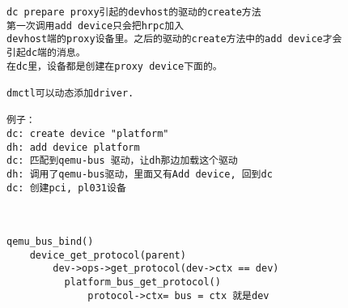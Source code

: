 \begin{verbatim}
dc prepare proxy引起的devhost的驱动的create方法
第一次调用add device只会把hrpc加入
devhost端的proxy设备里。之后的驱动的create方法中的add device才会
引起dc端的消息。
在dc里，设备都是创建在proxy device下面的。

dmctl可以动态添加driver.

例子：
dc: create device "platform"
dh: add device platform
dc: 匹配到qemu-bus 驱动，让dh那边加载这个驱动
dh: 调用了qemu-bus驱动，里面又有Add device, 回到dc
dc: 创建pci, pl031设备



qemu_bus_bind()
    device_get_protocol(parent)
        dev->ops->get_protocol(dev->ctx == dev)
          platform_bus_get_protocol()
              protocol->ctx= bus = ctx 就是dev
\end{verbatim}

              